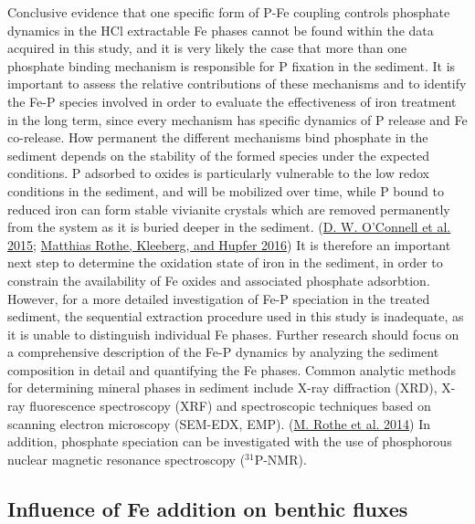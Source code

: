 \documentclass[a4paper,11pt]{article}
\begin{document}
Conclusive evidence that one specific form of P-Fe coupling controls phosphate dynamics in the HCl extractable Fe phases cannot be found within the data acquired in this study, and it is very likely the case that more than one phosphate binding mechanism is responsible for P fixation in the sediment. It is important to assess the relative contributions of these mechanisms and to identify the Fe-P species involved in order to evaluate the effectiveness of iron treatment in the long term, since every mechanism has specific dynamics of P release and Fe co-release. How permanent the different mechanisms bind phosphate in the sediment depends on the stability of the formed species under the expected conditions. P adsorbed to oxides is particularly vulnerable to the low redox conditions in the sediment, and will be mobilized over time, while P bound to reduced iron can form stable vivianite crystals which are removed permanently from the system as it is buried deeper in the sediment. (\protect\hyperlink{ref-oconnellVivianiteFormationIts2015}{D. W. O'Connell et al. 2015}; \protect\hyperlink{ref-rotheOccurrenceIdentificationEnvironmental2016}{Matthias Rothe, Kleeberg, and Hupfer 2016}) It is therefore an important next step to determine the oxidation state of iron in the sediment, in order to constrain the availability of Fe oxides and associated phosphate adsorbtion. However, for a more detailed investigation of Fe-P speciation in the treated sediment, the sequential extraction procedure used in this study is inadequate, as it is unable to distinguish individual Fe phases. Further research should focus on a comprehensive description of the Fe-P dynamics by analyzing the sediment composition in detail and quantifying the Fe phases. Common analytic methods for determining mineral phases in sediment include X-ray diffraction (XRD), X-ray fluorescence spectroscopy (XRF) and spectroscopic techniques based on scanning electron microscopy (SEM-EDX, EMP). (\protect\hyperlink{ref-rotheEvidenceVivianiteFormation2014}{M. Rothe et al. 2014}) In addition, phosphate speciation can be investigated with the use of phosphorous nuclear magnetic resonance spectroscopy (\(^{31}\)P-NMR).

\hypertarget{influence-of-fe-addition-on-benthic-fluxes}{%
\subsection{Influence of Fe addition on benthic fluxes}\label{influence-of-fe-addition-on-benthic-fluxes}}
\end{document}
